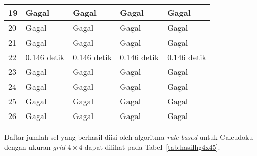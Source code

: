 \begin{table}
\begin{tabular}{| l | l | l | l | l |}
\hline
19 & Gagal & Gagal & Gagal & Gagal \\
\hline
20 & Gagal & Gagal & Gagal & Gagal \\
\hline
21 & Gagal & Gagal & Gagal & Gagal \\
\hline
22 & 0.146 detik & 0.146 detik & 0.146 detik & 0.146 detik \\
\hline
23 & Gagal & Gagal & Gagal & Gagal \\
\hline
24 & Gagal & Gagal & Gagal & Gagal \\
\hline
25 & Gagal & Gagal & Gagal & Gagal \\
\hline
26 & Gagal & Gagal & Gagal & Gagal \\
\hline
\end{tabular}
\label{tab:hasilhg5x54}
\end{table}

Daftar jumlah sel yang berhasil diisi oleh algoritma \textit{rule based} untuk Calcudoku dengan ukuran \textit{grid} \begin{math}4 \times 4\end{math} dapat dilihat pada Tabel~\ref{tab:hasilhg4x45}.

